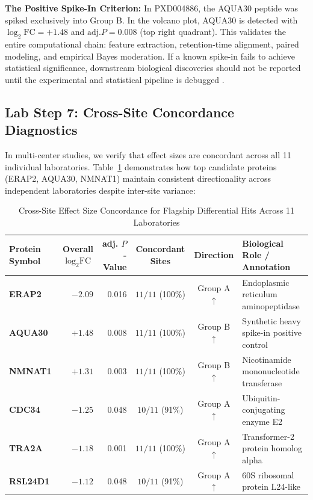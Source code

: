 \documentclass[11pt,twoside,openright]{book}
\begin{document}
\begin{biologicalinsight}
\textbf{The Positive Spike-In Criterion:} In PXD004886, the AQUA30 peptide was spiked exclusively into Group B. In the volcano plot, AQUA30 is detected with $\log_2\text{FC} = +1.48$ and $\text{adj.} P = 0.008$ (top right quadrant). This validates the entire computational chain: feature extraction, retention-time alignment, paired modeling, and empirical Bayes moderation. If a known spike-in fails to achieve statistical significance, downstream biological discoveries should not be reported until the experimental and statistical pipeline is debugged \cite{bruderer2017optimization}.
\end{biologicalinsight}

\subsection{Lab Step 7: Cross-Site Concordance Diagnostics}

In multi-center studies, we verify that effect sizes are concordant across all 11 individual laboratories. Table~\ref{tab:concordance} demonstrates how top candidate proteins (ERAP2, AQUA30, NMNAT1) maintain consistent directionality across independent laboratories despite inter-site variance:

\begin{table}[htbp]
\centering
\caption{Cross-Site Effect Size Concordance for Flagship Differential Hits Across 11 Laboratories}
\label{tab:concordance}
\small
\begin{tabularx}{\textwidth}{lrrccX}
\toprule
\textbf{Protein Symbol} & \textbf{Overall $\log_2\text{FC}$} & \textbf{adj. $P$-Value} & \textbf{Concordant Sites} & \textbf{Direction} & \textbf{Biological Role / Annotation} \\
\midrule
\textbf{ERAP2}   & $-2.09$ & 0.016 & $11 / 11$ (100\%) & Group A $\uparrow$ & Endoplasmic reticulum aminopeptidase \\
\textbf{AQUA30}  & $+1.48$ & 0.008 & $11 / 11$ (100\%) & Group B $\uparrow$ & Synthetic heavy spike-in positive control \\
\textbf{NMNAT1}  & $+1.31$ & 0.003 & $11 / 11$ (100\%) & Group B $\uparrow$ & Nicotinamide mononucleotide transferase \\
\textbf{CDC34}   & $-1.25$ & 0.048 & $10 / 11$ (91\%)  & Group A $\uparrow$ & Ubiquitin-conjugating enzyme E2 \\
\textbf{TRA2A}   & $-1.18$ & 0.001 & $11 / 11$ (100\%) & Group A $\uparrow$ & Transformer-2 protein homolog alpha \\
\textbf{RSL24D1} & $-1.12$ & 0.048 & $10 / 11$ (91\%)  & Group A $\uparrow$ & 60S ribosomal protein L24-like \\
\bottomrule
\end{tabularx}
\end{table}
\end{document}
